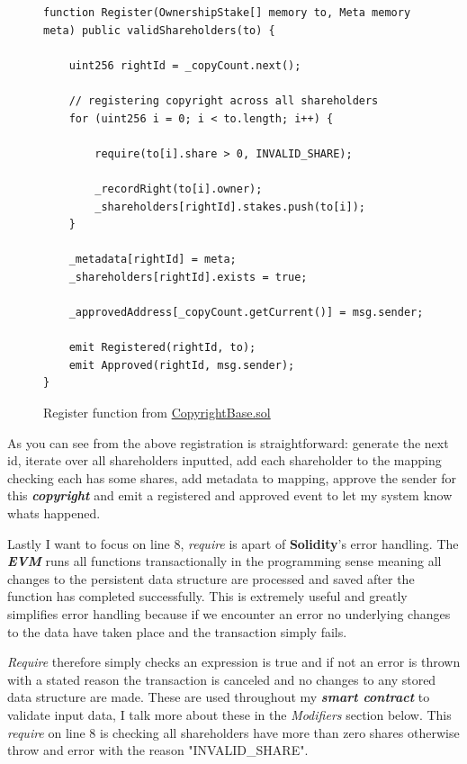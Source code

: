 \documentclass[12pt]{article}
\newcommand{\keyword}[1]{\textbf{\textit{#1}}}
\begin{document}
\begin{figure}[H]
\caption{Register function from \href{https://github.com/MrHarrisonBarker/CRPL/blob/main/CRPL.Contracts/contracts/Copyrights/CopyrightBase.sol}{CopyrightBase.sol}}
\centering
\begin{lstlisting}[language=Solidity]
function Register(OwnershipStake[] memory to, Meta memory meta) public validShareholders(to) {
	
	uint256 rightId = _copyCount.next();

	// registering copyright across all shareholders
	for (uint256 i = 0; i < to.length; i++) {

		require(to[i].share > 0, INVALID_SHARE);

		_recordRight(to[i].owner);
		_shareholders[rightId].stakes.push(to[i]);
	}
        
	_metadata[rightId] = meta;
	_shareholders[rightId].exists = true;
        
	_approvedAddress[_copyCount.getCurrent()] = msg.sender;

	emit Registered(rightId, to);
	emit Approved(rightId, msg.sender);
}	
\end{lstlisting}
\end{figure}

As you can see from the above registration is straightforward: generate the next id, iterate over all shareholders inputted, add each shareholder to the mapping checking each has some shares, add metadata to mapping, approve the sender for this \keyword{copyright} and emit a registered and approved event to let my system know whats happened.

Lastly I want to focus on line 8, \textit{require} is apart of \textbf{Solidity}'s error handling. The \keyword{EVM} runs all functions transactionally in the programming sense meaning all changes to the persistent data structure are processed and saved after the function has completed successfully. This is extremely useful and greatly simplifies error handling because if we encounter an error no underlying changes to the data have taken place and the transaction simply fails. 

\textit{Require} therefore simply checks an expression is true and if not an error is thrown with a stated reason the transaction is canceled and no changes to any stored data structure are made. These are used throughout my \keyword{smart contract} to validate input data, I talk more about these in the \textit{Modifiers} section below. This \textit{require} on line 8 is checking all shareholders have more than zero shares otherwise throw and error with the reason "INVALID\_SHARE".
\end{document}
